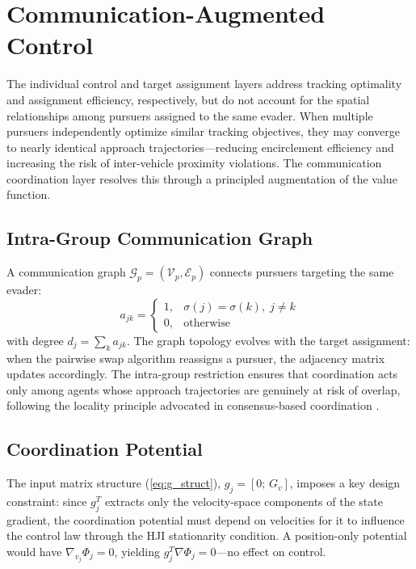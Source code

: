 \documentclass[conference]{IEEEtran}
\begin{document}
\section{Communication-Augmented Control}

The individual control and target assignment layers address tracking optimality and assignment efficiency, respectively, but do not account for the spatial relationships among pursuers assigned to the same evader. When multiple pursuers independently optimize similar tracking objectives, they may converge to nearly identical approach trajectories---reducing encirclement efficiency and increasing the risk of inter-vehicle proximity violations. The communication coordination layer resolves this through a principled augmentation of the value function.

\subsection{Intra-Group Communication Graph}

A communication graph $\mathcal{G}_p = (\mathcal{V}_p, \mathcal{E}_p)$ connects pursuers targeting the same evader:
\begin{equation}\label{eq:adj}
a_{jk} = \begin{cases} 1, & \sigma(j) = \sigma(k),\; j \neq k \\ 0, & \text{otherwise} \end{cases}
\end{equation}
with degree $d_j = \sum_k a_{jk}$. The graph topology evolves with the target assignment: when the pairwise swap algorithm reassigns a pursuer, the adjacency matrix updates accordingly. The intra-group restriction ensures that coordination acts only among agents whose approach trajectories are genuinely at risk of overlap, following the locality principle advocated in consensus-based coordination \cite{b_ren2005,b_olfati2004}.

\subsection{Coordination Potential}

The input matrix structure (\ref{eq:g_struct}), $g_j = [0;\, G_v]$, imposes a key design constraint: since $g_j^T$ extracts only the velocity-space components of the state gradient, the coordination potential must depend on velocities for it to influence the control law through the HJI stationarity condition. A position-only potential would have $\nabla_{v_j}\Phi_j = 0$, yielding $g_j^T\nabla\Phi_j = 0$---no effect on control.
\end{document}
